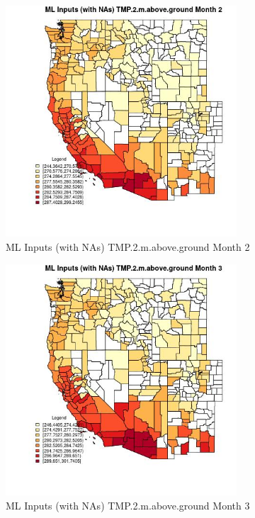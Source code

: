 \begin{figure} 
\centering  
\includegraphics[width=0.77\textwidth]{Code_Outputs/Report_ML_input_PM25_Step4_part_f_de_duplicated_aveswNAs_CountyTMP2mabovegroundmedianMonth2.jpg} 
\caption{\label{fig:Report_ML_input_PM25_Step4_part_f_de_duplicated_aveswNAsCountyTMP2mabovegroundmedianMonth2}ML Inputs (with NAs) TMP.2.m.above.ground Month 2} 
\end{figure} 
 

\begin{figure} 
\centering  
\includegraphics[width=0.77\textwidth]{Code_Outputs/Report_ML_input_PM25_Step4_part_f_de_duplicated_aveswNAs_CountyTMP2mabovegroundmedianMonth3.jpg} 
\caption{\label{fig:Report_ML_input_PM25_Step4_part_f_de_duplicated_aveswNAsCountyTMP2mabovegroundmedianMonth3}ML Inputs (with NAs) TMP.2.m.above.ground Month 3} 
\end{figure} 
 

